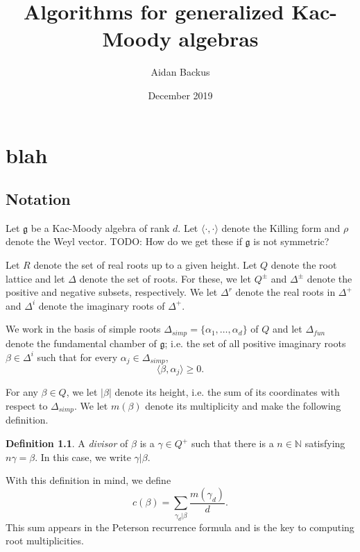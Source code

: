 \documentclass[12pt]{report}
\title{Algorithms for generalized Kac-Moody algebras}
\author{Aidan Backus}
\date{December 2019}
\newcommand{\NN}{\mathbb{N}}
\newcommand{\g}{\mathfrak g}
\newcommand{\dfn}[1]{\emph{#1}\index{#1}}
\theoremstyle{definition}
\newtheorem{definition}[theorem]{Definition}
\begin{document}
\chapter{blah}
\section{Notation}
Let $\g$ be a Kac-Moody algebra of rank $d$. Let $\langle\cdot,\cdot\rangle$ denote the Killing form and $\rho$ denote the Weyl vector. TODO: How do we get these if $\g$ is not symmetric?

Let $R$ denote the set of real roots up to a given height. Let $Q$ denote the root lattice and let $\Delta$ denote the set of roots. For these, we let $Q^\pm$ and $\Delta^\pm$ denote the positive and negative subsets, respectively. We let $\Delta^r$ denote the real roots in $\Delta^+$ and $\Delta^i$ denote the imaginary roots of $\Delta^+$.

We work in the basis of simple roots $\Delta_{simp} = \{\alpha_1, \dots, \alpha_d\}$ of $Q$ and let $\Delta_{fun}$ denote the fundamental chamber of $\g$; i.e. the set of all positive imaginary roots $\beta \in \Delta^i$ such that for every $\alpha_j \in \Delta_{simp}$,
$$\langle \beta, \alpha_j\rangle \geq 0.$$

For any $\beta \in Q$, we let $|\beta|$ denote its height, i.e. the sum of its coordinates with respect to $\Delta_{simp}$. We let $m(\beta)$ denote its multiplicity and make the following definition.
\begin{definition}
	A \dfn{divisor} of $\beta$ is a $\gamma \in Q^+$ such that there is a $n \in \NN$ satisfying $n\gamma = \beta$. In this case, we write $\gamma|\beta$.
\end{definition}
With this definition in mind, we define
$$c(\beta) = \sum_{\gamma_d|\beta} \frac{m(\gamma_d)}{d}.$$
This sum appears in the Peterson recurrence formula and is the key to computing root multiplicities.
\end{document}

